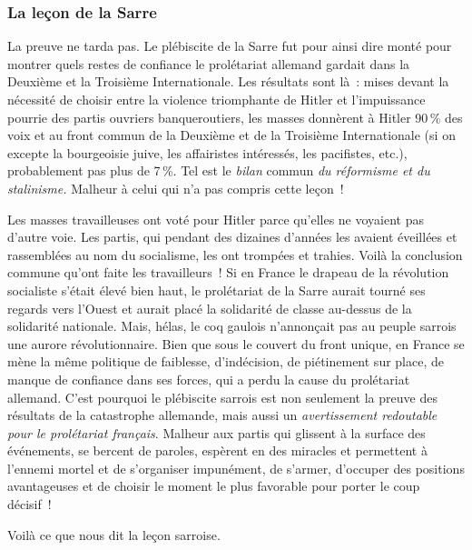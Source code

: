 \documentclass[french,twoside]{book} %
\begin{document}
\subsubsection[{La leçon de la Sarre}]{La leçon de la Sarre}
\noindent La preuve ne tarda pas. Le plébiscite de la Sarre fut pour ainsi dire monté pour montrer quels restes de confiance le prolétariat allemand gardait dans la Deuxième et la Troisième Internationale. Les résultats sont là : mises devant la nécessité de choisir entre la violence triomphante de Hitler et l’impuissance pourrie des partis ouvriers  banqueroutiers, les masses donnèrent à Hitler 90 \% des voix et au front commun de la Deuxième et de la Troisième Internationale (si on excepte la bourgeoisie juive, les affairistes intéressés, les pacifistes, etc.), probablement pas plus de 7 \%. Tel est le \emph{bilan} commun \emph{du réformisme et du stalinisme.} Malheur à celui qui n’a pas compris cette leçon !\par
Les masses travailleuses ont voté pour Hitler parce qu’elles ne voyaient pas d’autre voie. Les partis, qui pendant des dizaines d’années les avaient éveillées et rassemblées au nom du socialisme, les ont trompées et trahies. Voilà la conclusion commune qu’ont faite les travailleurs ! Si en France le drapeau de la révolution socialiste s’était élevé bien haut, le prolétariat de la Sarre aurait tourné ses regards vers l’Ouest et aurait placé la solidarité de classe au-dessus de la solidarité nationale. Mais, hélas, le coq gaulois n’annonçait pas au peuple sarrois une aurore révolutionnaire. Bien que sous le couvert du front unique, en France se mène la même politique de faiblesse, d’indécision, de piétinement sur place, de manque de confiance dans ses forces, qui a perdu la cause du prolétariat allemand. C’est pourquoi le plébiscite sarrois est non seulement la preuve des résultats de la catastrophe allemande, mais aussi un \emph{avertissement redoutable pour le prolétariat français}. Malheur aux partis qui glissent à la surface des événements, se bercent de paroles, espèrent en des miracles et permettent à l’ennemi mortel et de s’organiser impunément, de s’armer, d’occuper des positions avantageuses et de choisir le moment le plus favorable pour porter le coup décisif !\par
Voilà ce que nous dit la leçon sarroise.
\end{document}
